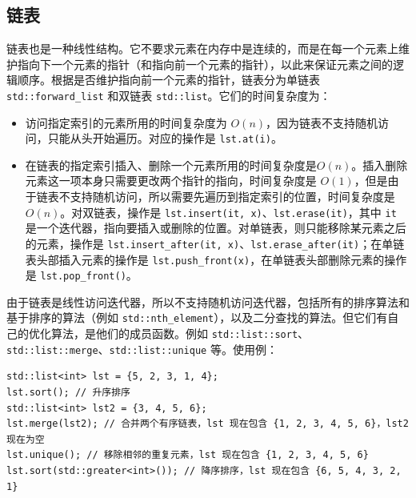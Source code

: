 \subsection{链表}

链表也是一种线性结构。它不要求元素在内存中是连续的，而是在每一个元素上维护指向下一个元素的指针（和指向前一个元素的指针），以此来保证元素之间的逻辑顺序。根据是否维护指向前一个元素的指针，链表分为单链表 \verb|std::forward_list| 和双链表 \verb|std::list|。它们的时间复杂度为：
\begin{itemize}
    \item 访问指定索引的元素所用的时间复杂度为 $O(n)$，因为链表不支持随机访问，只能从头开始遍历。对应的操作是 \verb|lst.at(i)|。
    \item 在链表的指定索引插入、删除一个元素所用的时间复杂度是$O(n)$。插入删除元素这一项本身只需要更改两个指针的指向，时间复杂度是 $O(1)$，但是由于链表不支持随机访问，所以需要先遍历到指定索引的位置，时间复杂度是 $O(n)$。对双链表，操作是 \verb|lst.insert(it, x)|、\verb|lst.erase(it)|，其中 \verb|it| 是一个迭代器，指向要插入或删除的位置。对单链表，则只能移除某元素之后的元素，操作是 \verb|lst.insert_after(it, x)|、\verb|lst.erase_after(it)|；在单链表头部插入元素的操作是 \verb|lst.push_front(x)|，在单链表头部删除元素的操作是 \verb|lst.pop_front()|。
\end{itemize}

由于链表是线性访问迭代器，所以不支持随机访问迭代器，包括所有的排序算法和基于排序的算法（例如 \verb|std::nth_element|），以及二分查找的算法。但它们有自己的优化算法，是他们的成员函数。例如 \verb|std::list::sort|、\verb|std::list::merge|、\verb|std::list::unique| 等。使用例：
\begin{verbatim}
std::list<int> lst = {5, 2, 3, 1, 4};
lst.sort(); // 升序排序
std::list<int> lst2 = {3, 4, 5, 6};
lst.merge(lst2); // 合并两个有序链表，lst 现在包含 {1, 2, 3, 4, 5, 6}，lst2 现在为空
lst.unique(); // 移除相邻的重复元素，lst 现在包含 {1, 2, 3, 4, 5, 6}
lst.sort(std::greater<int>()); // 降序排序，lst 现在包含 {6, 5, 4, 3, 2, 1}
\end{verbatim}

